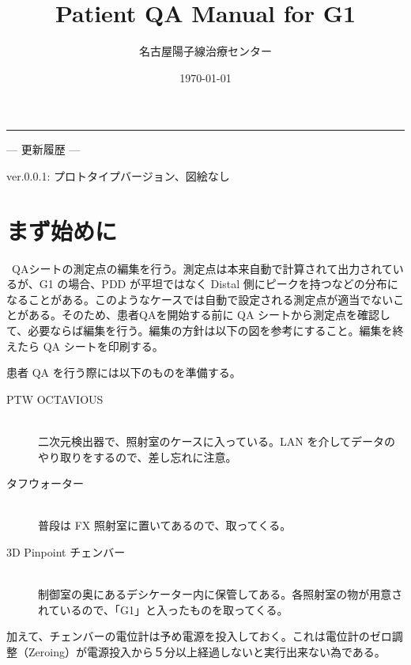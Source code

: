 \documentclass[11pt,a4paper]{jsarticle}
\title{Patient QA Manual for G1}
\author{名古屋陽子線治療センター}
\date{\today}
\makeatletter
\newcommand{\noindot}{\noindent{$\cdot$}} %
\newcommand{\rev}[2]{ver.{#1}: #2}
\renewcommand{\maketitle}{\begin{titlepage}%
    \let\footnotesize\small
    \let\footnoterule\relax
    \parindent \z@
    \reset@font
    \null\vfil
    \begin{flushleft}
      \huge \@title
    \end{flushleft}
    \par
    \hrule height 4pt
    \par
    \begin{flushright}
      \LARGE \@author \par
    \end{flushright}
    \vskip 20\p@
    \begin{flushright}
    	--- 更新履歴 --- \par
	\rev{0.0.1}{プロトタイプバージョン、図絵なし}\par
    \end{flushright}
    \vskip 60\p@
    \vfil\null
    \begin{flushright}
        {\small \@date}%
    \end{flushright}
  \end{titlepage}%
  \setcounter{footnote}{0}%
}
\makeatother
\begin{document}
%
\maketitle
%
\section{まず始めに}
\noindot ~QAシートの測定点の編集を行う。測定点は本来自動で計算されて出力されているが、G1 の場合、PDD が平坦ではなく Distal 側にピークを持つなどの分布になることがある。このようなケースでは自動で設定される測定点が適当でないことがある。そのため、患者QAを開始する前に QA シートから測定点を確認して、必要ならば編集を行う。編集の方針は以下の図を参考にすること。編集を終えたら QA シートを印刷する。\par
\noindot 患者 QA を行う際には以下のものを準備する。
	\begin{description}
		\item[PTW OCTAVIOUS]\mbox{}\\
		二次元検出器で、照射室のケースに入っている。LAN を介してデータのやり取りをするので、差し忘れに注意。
		\item[タフウォーター]\mbox{}\\
		普段は FX 照射室に置いてあるので、取ってくる。
		\item[3D Pinpoint チェンバー]\mbox{}\\
		制御室の奥にあるデシケーター内に保管してある。各照射室の物が用意されているので、「G1」と入ったものを取ってくる。
	\end{description}%
加えて、チェンバーの電位計は予め電源を投入しておく。これは電位計のゼロ調整（Zeroing）が電源投入から５分以上経過しないと実行出来ない為である。
\end{document}
